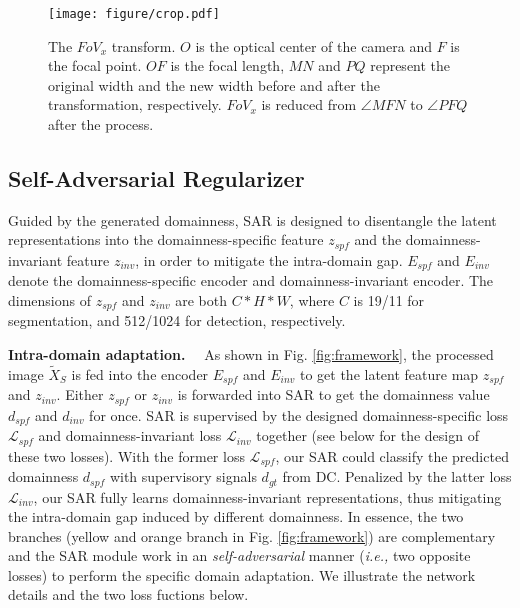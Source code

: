 \documentclass[10pt,journal,compsoc]{IEEEtran}
\renewcommand{\paragraph}[1]{\noindent\textbf{#1}~~}
\begin{document}
\begin{figure}[!t]
\centering
\texttt{[image: figure/crop.pdf]}
\caption{The $FoV_{x}$ transform. $O$ is the optical center of the camera and $F$ is the focal point. $OF$ is the focal length, $MN$ and $PQ $ represent the original width and the new width before and after the transformation, respectively.  $FoV_{x}$ is reduced from $\angle MFN$ to $\angle PFQ$ after the process. }
\label{fig:crop}
\end{figure}
\vspace{-2mm}


\subsection{Self-Adversarial Regularizer}
\label{sec: sar}

Guided by the generated domainness, SAR is designed to disentangle the latent representations into the domainness-specific feature $z_{spf}$ and the domainness-invariant feature $z_{inv}$, in order to mitigate the intra-domain gap. 
$E_{spf}$ and $E_{inv}$ denote the domainness-specific encoder and domainness-invariant encoder. 
The dimensions of $z_{spf}$ and $z_{inv}$ are both $C*H*W$, where $C$ is 19/11 for segmentation, and 512/1024 for detection, respectively.

\paragraph{Intra-domain adaptation.}
As shown in Fig. \ref{fig:framework}, the processed image $\tilde{X}_{S}$ is fed into the encoder $E_{spf}$ and $E_{inv}$ to get the latent feature map $z_{spf}$ and $z_{inv}$. Either $z_{spf}$ or  $z_{inv}$ is forwarded into SAR to get the domainness value $d_{spf}$ and $d_{inv}$ for once.  
SAR is supervised by the designed domainness-specific loss $\mathcal{L}_{spf}$ and  domainness-invariant loss $\mathcal{L}_{inv}$ together (see below for the design of these two losses). With the former loss $\mathcal{L}_{spf}$, our SAR could classify the predicted domainness $d_{spf}$ with supervisory signals $d_{gt}$ from DC.  Penalized by the latter loss $\mathcal{L}_{inv}$, our SAR fully learns domainness-invariant representations, thus mitigating the intra-domain gap induced by different domainness. 
In essence, the two branches (yellow and orange branch in Fig. \ref{fig:framework}) are complementary and the SAR module work in an \textit{self-adversarial} manner (\emph{i.e.,} two opposite losses) to perform the specific domain adaptation. We illustrate the network details and the two loss fuctions below.
\end{document}
